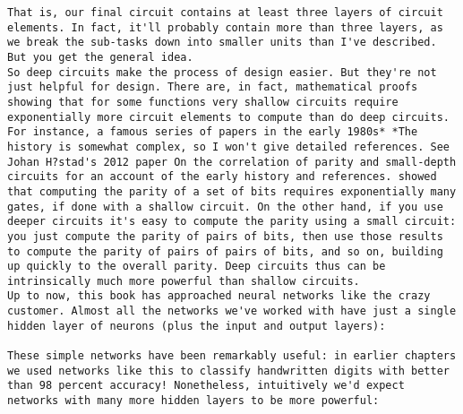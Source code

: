 \begin{lstlisting}
That is, our final circuit contains at least three layers of circuit elements. In fact, it'll probably contain more than three layers, as we break the sub-tasks down into smaller units than I've described. But you get the general idea.
So deep circuits make the process of design easier. But they're not just helpful for design. There are, in fact, mathematical proofs showing that for some functions very shallow circuits require exponentially more circuit elements to compute than do deep circuits. For instance, a famous series of papers in the early 1980s* *The history is somewhat complex, so I won't give detailed references. See Johan H?stad's 2012 paper On the correlation of parity and small-depth circuits for an account of the early history and references. showed that computing the parity of a set of bits requires exponentially many gates, if done with a shallow circuit. On the other hand, if you use deeper circuits it's easy to compute the parity using a small circuit: you just compute the parity of pairs of bits, then use those results to compute the parity of pairs of pairs of bits, and so on, building up quickly to the overall parity. Deep circuits thus can be intrinsically much more powerful than shallow circuits.
Up to now, this book has approached neural networks like the crazy customer. Almost all the networks we've worked with have just a single hidden layer of neurons (plus the input and output layers):

These simple networks have been remarkably useful: in earlier chapters we used networks like this to classify handwritten digits with better than 98 percent accuracy! Nonetheless, intuitively we'd expect networks with many more hidden layers to be more powerful:


\end{lstlisting}
